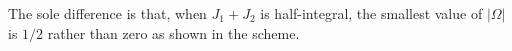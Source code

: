 The sole difference is that, when $J_1+J_2$ is half-integral, the smallest value of $|\Omega|$ is $1/2$ rather than zero as shown in the scheme.

